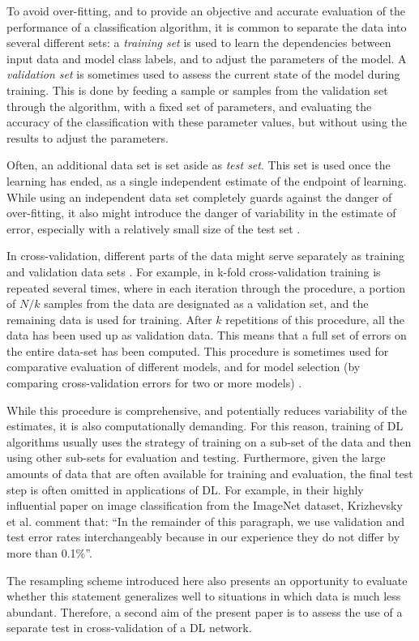 To avoid over-fitting, and to provide an objective and accurate evaluation of
the performance of a classification algorithm, it is common to separate the data
into several different sets: a \emph{training set} is used to learn the
dependencies between input data and model class labels, and to adjust the
parameters of the model. A \emph{validation set} is sometimes used to assess the
current state of the model during training. This is done by feeding a sample or
samples from the validation set through the algorithm, with a fixed set of
parameters, and evaluating the accuracy of the classification with these
parameter values, but without using the results to adjust the parameters.

Often, an additional data set is set aside as \emph{test set}. This set is used
once the learning has ended, as a single independent estimate of the endpoint of
learning. While using an independent data set completely guards against the
danger of over-fitting, it also might introduce the danger of variability in the
estimate of error, especially with a relatively small size of the test set
\citep{Efron1983-vu}.

In cross-validation, different parts of the data might serve separately as
training and validation data sets \citep{Stone1974-mo}. For example, in k-fold
cross-validation training is repeated several times, where in each iteration
through the procedure, a portion of $N/k$ samples from the data are designated
as a validation set, and the remaining data is used for training. After $k$
repetitions of this procedure, all the data has been used up as validation data.
This means that a full set of errors on the entire data-set has been computed.
This procedure is sometimes used for comparative evaluation of different models,
and for model selection (by comparing cross-validation errors for two or more
models) \citep{Stone1977-ez}.

While this procedure is comprehensive, and potentially reduces variability of
the estimates, it is also computationally demanding. For this reason, training
of DL algorithms usually uses the strategy of training on a sub-set of the data
and then using other sub-sets for evaluation and testing.  Furthermore, given
the large amounts of data that are often available for training and evaluation,
the final test step is often omitted in applications of DL. For example, in
their highly influential paper on image classification from the ImageNet
dataset, Krizhevsky et al. \citep{Krizhevsky2012-qc} comment that: ``In the
remainder of this paragraph, we use validation and test error rates
interchangeably because in our experience they do not differ by more than
0.1\%''.

The resampling scheme introduced here also presents an opportunity to evaluate
whether this statement generalizes well to situations in which data is much less
abundant. Therefore, a second aim of the present paper is to assess the use of a
separate test in cross-validation of a DL network.
